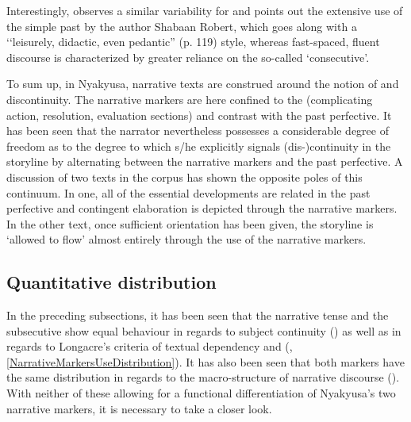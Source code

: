 Interestingly, \citet[118--120]{ContiniMoravaE1989} observes a similar variability for  and points out the extensive use of the simple past by the author Shabaan Robert, which goes along with a \lq\lq leisurely, didactic, even pedantic'' (p. 119) style, whereas fast-spaced, fluent discourse is characterized by greater reliance on the so-called \lq consecutive'.

To sum up, in Nyakyusa, narrative texts are construed around the notion of  and discontinuity. The narrative markers are here confined to the  (complicating action, resolution, evaluation sections) and contrast with the past perfective. It has been seen that the narrator nevertheless possesses a considerable degree of freedom as to the degree to which s/he explicitly signals (dis-)continuity in the storyline by alternating between the narrative markers and the past perfective. A discussion of two texts in the corpus has shown the opposite poles of this continuum. In one, all of the essential developments are related in the past perfective and contingent elaboration is depicted through the narrative markers. In the other text, once sufficient orientation has been given, the storyline is \lq allowed to flow' almost entirely through the use of the narrative markers.


\subsection{Quantitative distribution}\label{NarrativeMarkersQuantitativeDistribution}
In the preceding subsections, it has been seen that the narrative tense and the subsecutive show equal behaviour in regards to subject continuity () as well as in regards to Longacre's criteria of textual dependency and  (, \ref{NarrativeMarkersUseDistribution}). It has also been seen that both markers have the same distribution in regards to the macro-structure of narrative discourse (). With neither of these allowing for a functional differentiation of Nyakyusa's two narrative markers, it is necessary to take a closer look.

